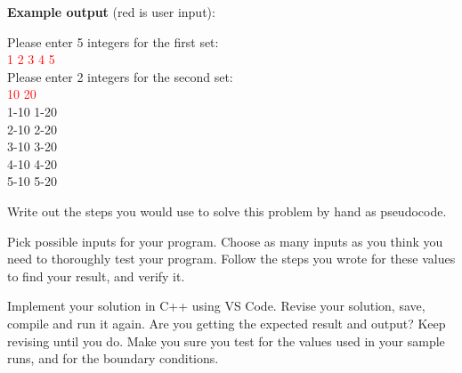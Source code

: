 \textbf{Example output} (red is user input):

\begin{sample}
Please enter 5 integers for the first set: \\
\textcolor{red}{1 2 3 4 5}\\
Please enter 2 integers for the second set: \\
\textcolor{red}{10 20}\\
1-10 1-20\\
2-10 2-20\\
3-10 3-20\\
4-10 4-20\\
5-10 5-20
\end{sample}


\begin{multipart}
    Write out the steps you would use to solve this problem by hand as pseudocode. 
\end{multipart}

\newpage

\begin{multipart}
Pick possible inputs for your program. Choose as many inputs as you think you need to thoroughly test your program. Follow the steps you wrote for these values to find your result, and verify it.
\end{multipart}

\vspace{14cm}

\begin{multipart}
Implement your solution in C++ using VS Code. Revise your solution, save, compile and run it again. Are you getting the expected result and output? Keep revising until you do. Make you sure you test for the values used in your sample runs, and for the boundary conditions.
\end{multipart}

